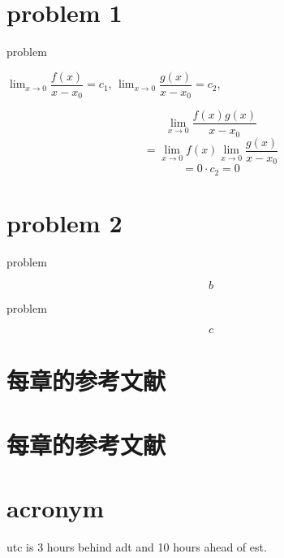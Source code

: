 \documentclass[ebook,fleqn]{problemset}
\begin{document}
\listoftodos %
\tableofcontents %
\chapter{problem 1}
  \begin{problem}
    problem
  \end{problem}

  \begin{solution}
    $\lim_{x \to 0} \dfrac{f(x)}{x-x_0} = c_1$,
    $\lim_{x \to 0} \dfrac{g(x)}{x-x_0} = c_2$,

    \[
      \lim_{x\to0} \dfrac{f(x)g(x)}{x-x_0}
    \]
    \[
     = \lim_{x\to0} f(x) \lim_{x \to 0} \dfrac{g(x)}{x-x_0}
    \]
    \[
      = 0 \cdot c_2 = 0
    \]
  \end{solution}
\chapter{problem 2}

  \begin{problem}
    problem
  \end{problem}
  \begin{solution}
      \[b\]
  \end{solution}
  \begin{problem}
    problem
  \end{problem}
  \begin{solution}
      \[c\]
  \end{solution}

\chapter{每章的参考文献}
  \newrefsection
  
  \printbibliography
\chapter{每章的参考文献}
  \newrefsection
  
  \printbibliography

\chapter{acronym}


\gls{utc} is 3 hours behind \gls{adt} and 10 hours ahead of \gls{est}.

\printglossary[type=\acronymtype,title={try acronym}]


\end{document}
